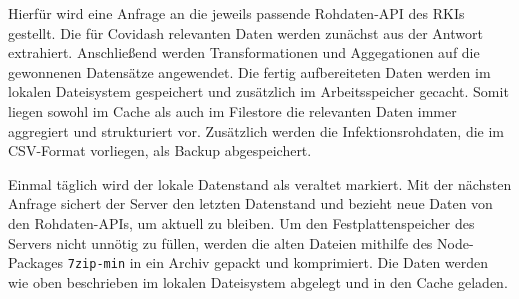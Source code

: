 \documentclass[conference]{IEEEtran}
\begin{document}
Hierfür wird eine Anfrage an die jeweils passende Rohdaten-API des RKIs gestellt. Die für Covidash relevanten Daten werden zunächst aus der Antwort extrahiert. Anschließend werden Transformationen und Aggegationen auf die gewonnenen Datensätze angewendet. Die fertig aufbereiteten Daten werden im lokalen Dateisystem gespeichert und zusätzlich im Arbeitsspeicher gecacht. Somit liegen sowohl im Cache als auch im Filestore die relevanten Daten immer aggregiert und strukturiert vor.
Zusätzlich werden die Infektionsrohdaten, die im CSV-Format vorliegen, als Backup abgespeichert.

Einmal täglich wird der lokale Datenstand als veraltet markiert. Mit der nächsten Anfrage sichert der Server den letzten Datenstand und bezieht neue Daten von den Rohdaten-APIs, um aktuell zu bleiben. Um den Festplattenspeicher des Servers nicht unnötig zu füllen, werden die alten Dateien mithilfe des Node-Packages \texttt{7zip-min}\cite{7zm} in ein Archiv gepackt und komprimiert. Die Daten werden wie oben beschrieben im lokalen Dateisystem abgelegt und in den Cache geladen.
\end{document}
